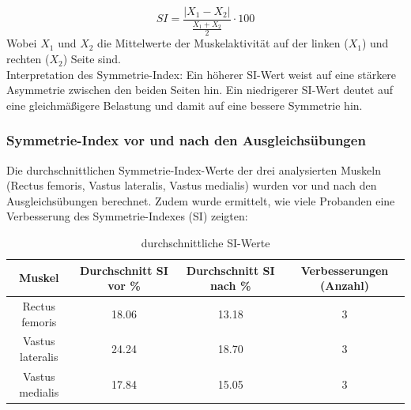 \begin{equation}
    SI = \frac{|X_1 - X_2|}{\frac{X_1 + X_2}{2}} \cdot 100
\end{equation}
Wobei $X_1$ und $X_2$ die Mittelwerte der Muskelaktivität auf der linken ($X_1$) und rechten ($X_2$) Seite sind.
\\
Interpretation des Symmetrie-Index:
Ein höherer SI-Wert weist auf eine stärkere Asymmetrie zwischen den beiden Seiten hin.
Ein niedrigerer SI-Wert deutet auf eine gleichmäßigere Belastung und damit auf eine bessere Symmetrie hin.

\subsubsection{Symmetrie-Index vor und nach den Ausgleichsübungen}

Die durchschnittlichen Symmetrie-Index-Werte der drei analysierten Muskeln (Rectus femoris, Vastus lateralis, Vastus medialis) wurden vor und nach den Ausgleichsübungen berechnet. Zudem wurde ermittelt, wie viele Probanden eine Verbesserung des Symmetrie-Indexes (SI) zeigten:

\begin{table}[htbp]
  \centering
    \begin{tabular}{|c|c|c|c|}
    \hline
    \textbf{Muskel} & \textbf{Durchschnitt SI vor \%} & \textbf{Durchschnitt SI nach \%} & {\textbf{Verbesserungen (Anzahl)}} \\
    \hline
    Rectus femoris & \multicolumn{1}{c|}{18.06} & 13.18 & 3 \\
    \hline
    Vastus lateralis & 24.24 & 18.70 & 3 \\
    \hline
    Vastus medialis & 17.84 & 15.05 & 3 \\
    \hline
    \end{tabular}%
    \caption{durchschnittliche SI-Werte}
  \label{tab:durchschnittliche-SI-Werte}%
\end{table}%


